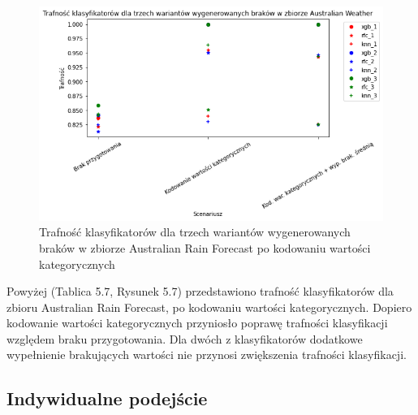\documentclass{book}
\begin{document}
    \begin{figure}[H]
        \centerline{\includegraphics[scale=0.8]{Aus_Weather_Kodowanie}}
        \centering
        \caption{Trafność klasyfikatorów dla trzech wariantów wygenerowanych braków w zbiorze Australian Rain Forecast po kodowaniu wartości kategorycznych}
        \end{figure}

Powyżej (Tablica 5.7, Rysunek 5.7) przedstawiono 
trafność klasyfikatorów dla zbioru Australian Rain Forecast, 
po kodowaniu wartości kategorycznych.
Dopiero kodowanie wartości kategorycznych przyniosło poprawę 
trafności klasyfikacji względem braku przygotowania.
Dla dwóch z klasyfikatorów dodatkowe wypełnienie brakujących wartości 
nie przynosi zwiększenia trafności klasyfikacji.

\subsection{Indywidualne podejście}
\end{document}
